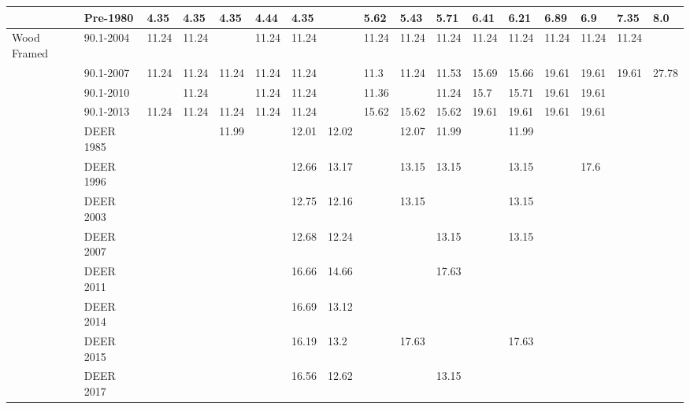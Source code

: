 \begin{table}
\begin{tabular}{p{0.3in}p{0.5in}p{0.15in}p{0.15in}p{0.15in}p{0.15in}p{0.15in}p{0.15in}p{0.15in}p{0.15in}p{0.15in}p{0.15in}p{0.15in}p{0.15in}p{0.15in}p{0.15in}p{0.15in}}
           & Pre-1980 &   4.35 &   4.35 &   4.35 &   4.44 &   4.35 &        &   5.62 &   5.43 &   5.71 &   6.41 &   6.21 &   6.89 &    6.9 &   7.35 &    8.0 \\ \hline
Wood Framed & 90.1-2004 &  11.24 &  11.24 &        &  11.24 &  11.24 &        &  11.24 &  11.24 &  11.24 &  11.24 &  11.24 &  11.24 &  11.24 &  11.24 &        \\
           & 90.1-2007 &  11.24 &  11.24 &  11.24 &  11.24 &  11.24 &        &   11.3 &  11.24 &  11.53 &  15.69 &  15.66 &  19.61 &  19.61 &  19.61 &  27.78 \\
           & 90.1-2010 &        &  11.24 &        &  11.24 &  11.24 &        &  11.36 &        &  11.24 &   15.7 &  15.71 &  19.61 &  19.61 &        &        \\
           & 90.1-2013 &  11.24 &  11.24 &  11.24 &  11.24 &  11.24 &        &  15.62 &  15.62 &  15.62 &  19.61 &  19.61 &  19.61 &  19.61 &        &        \\
           & DEER 1985 &        &        &  11.99 &        &  12.01 &  12.02 &        &  12.07 &  11.99 &        &  11.99 &        &        &        &        \\
           & DEER 1996 &        &        &        &        &  12.66 &  13.17 &        &  13.15 &  13.15 &        &  13.15 &        &   17.6 &        &        \\
           & DEER 2003 &        &        &        &        &  12.75 &  12.16 &        &  13.15 &        &        &  13.15 &        &        &        &        \\
           & DEER 2007 &        &        &        &        &  12.68 &  12.24 &        &        &  13.15 &        &  13.15 &        &        &        &        \\
           & DEER 2011 &        &        &        &        &  16.66 &  14.66 &        &        &  17.63 &        &        &        &        &        &        \\
           & DEER 2014 &        &        &        &        &  16.69 &  13.12 &        &        &        &        &        &        &        &        &        \\
           & DEER 2015 &        &        &        &        &  16.19 &   13.2 &        &  17.63 &        &        &  17.63 &        &        &        &        \\
           & DEER 2017 &        &        &        &        &  16.56 &  12.62 &        &        &  13.15 &        &        &        &        &        &        \\

\end{tabular}
\end{table}
